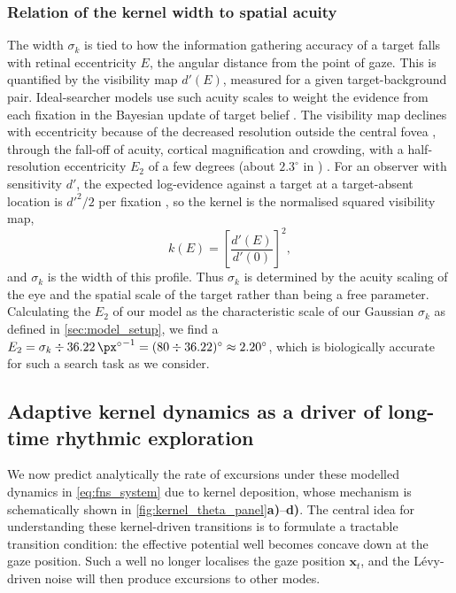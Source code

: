 \subsubsection*{Relation of the kernel width to spatial acuity}
The width $\sigma_k$ is tied to how the information gathering accuracy of a target falls with retinal eccentricity $E$, the angular distance from the point of gaze. This is quantified by the visibility map $d'(E)$, measured for a given target-background pair. Ideal-searcher models \cite{Ruarte2024.11.29.626088, najemnik_optimal_2005, zhou_human_2021, Renninger2005-ee, Bruce_2009_Saliency} use such acuity scales to weight the evidence from each fixation in the Bayesian update of target belief \cite{najemnik_optimal_2005, najemnik_eye_2008}. The visibility map declines with eccentricity because of the decreased resolution outside the central fovea \cite{ZHAOPING2026103211, kelly1962information, sziklai1956some}, through the fall-off of acuity, cortical magnification and crowding, with a half-resolution eccentricity $E_2$ of a few degrees (about $2.3^{\circ}$ in \textcite{geisler_real-time_1998}) \cite{levi_vernier_1985, strasburger_peripheral_2011}. For an observer with sensitivity $d'$, the expected log-evidence against a target at a target-absent location is $d'^2/2$ per fixation \cite{najemnik_optimal_2005, najemnik_eye_2008}, so the kernel is the normalised squared visibility map,
\begin{equation*}
    k(E) = \left[\frac{d'(E)}{d'(0)}\right]^{2},
\end{equation*}
and $\sigma_k$ is the width of this profile. Thus $\sigma_k$ is determined by the acuity scaling of the eye and the spatial scale of the target rather than being a free parameter. Calculating the $E_2$ of our model as the characteristic scale of our Gaussian $\sigma_k$ as defined in \cref{sec:model_setup}, we find a $E_2 = \sigma_k \div \qty{36.22}{\px \degree^{-1}} = (80 \div 36.22)\unit{\degree} \approx \qty{2.20}{\degree}$, which is biologically accurate for such a search task as we consider.

\subsection{Adaptive kernel dynamics as a driver of long-time rhythmic exploration}\label{subsec:adaptive_kernel_dynamics}
We now predict analytically the rate of excursions under these modelled dynamics in \cref{eq:fns_system} due to kernel deposition, whose mechanism is schematically shown in \cref{fig:kernel_theta_panel}\textbf{a)}--\textbf{d)}. The central idea for understanding these kernel-driven transitions is to formulate a tractable transition condition: the effective potential well becomes concave down at the gaze position. Such a well no longer localises the gaze position $\textbf{x}_t$, and the Lévy-driven noise will then produce excursions to other modes.

